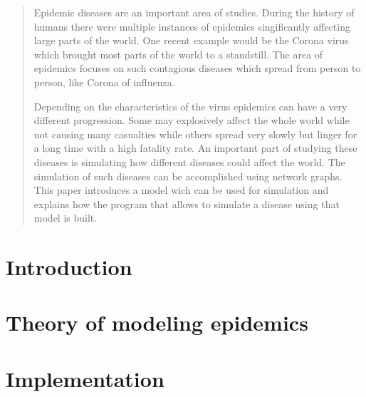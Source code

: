 \documentclass[oneside]{ausarbeitung}
\begin{document}
\begin{abstract}
 Epidemic diseases are an important area of studies. During the history of humans there
 were multiple instances of epidemics singificantly affecting large parts of the world.
 One recent example would be the Corona virus which brought most parts of the world to a 
 standstill. The area of epidemics focuses on such contagious diseases which spread from
 person to person, like Corona of influenza.

 Depending on the characteristics of the virus epidemics can have a very different progression.
 Some may explosively affect the whole world while not causing many casualties while others
 spread very slowly but linger for a long time with a high fatality rate. An important 
 part of studying these diseases is simulating how different diseases could affect the world.
 The simulation of such diseases can be accomplished using network graphs. This paper introduces
 a model wich can be used for simulation and explains how the program that allows to simulate
 a disease using that model is built.
\end{abstract}
\cleardoublepage
\tableofcontents

\listoffigures



\cleardoublepage
{}
\setcounter{page}{1}

\algrenewcommand{}
\algrenewcommand{}


\chapter{Introduction}
\label{cha:introduction}


\chapter{Theory of modeling epidemics}
\label{cha:general_principles}


\chapter{Implementation}
\label{cha:implementation}

\end{document}
